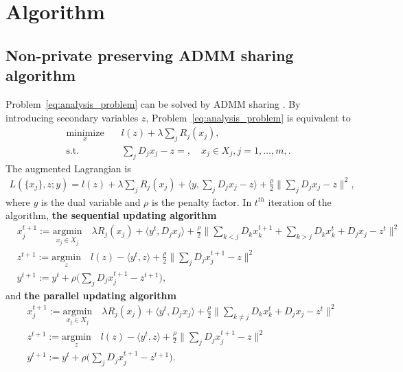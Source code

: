 \section{Algorithm}

\subsection{Non-private preserving ADMM sharing algorithm}
Problem~\eqref{eq:analysis_problem} can be solved by ADMM sharing \cite{boyd2011distributed, hong2016convergence}. By introducing secondary variables $z$, Problem~\eqref{eq:analysis_problem} is equivalent to
\begin{align}
\underset{x}{\text{minimize}} &\quad l\left(z\right) + \lambda\sum_j R_j(x_j),\\
\text{s.t.} &\quad \sum_j D_j x_j - z = ,\quad x_j\in X_j, j=1,\ldots,m,. 
\end{align}
The augmented Lagrangian is 
\begin{align}
L(\{x_j\}, z; y) = l(z) + \lambda\sum_j R_j(x_j) + \langle y, \sum_jD_j x_j - z\rangle + \frac{\rho}{2}\|\sum_j D_j x_j - z\|^2, \label{eq:lagragian}
\end{align}
where $y$ is the dual variable and $\rho$ is the penalty factor.  
In $t^{th}$ iteration of the algorithm, {\bf the sequential updating algorithm}
\begin{align}
&x_j^{t+1}:=\underset{x_j\in X_j}{\text{argmin}}\quad\lambda R_j(x_j) + \langle y^t, D_jx_j\rangle + \frac{\rho}{2}\big\|\sum_{k<j}D_kx_k^{t+1} + \sum_{k>j}D_kx_k^t + D_jx_j - z^t\big\|^2\label{eq:seq_algo_x}\\
&z^{t+1}:=\underset{z}{\text{argmin}}\quad l(z) - \langle y^t, z \rangle + \frac{\rho}{2} \big\|\sum_jD_jx_j^{t+1} - z\big\|^2\label{eq:seq_algo_z}\\
&y^{t+1}:=y^t + \rho\big(\sum_jD_jx_j^{t+1} - z^{t+1}\big),\label{eq:seq_algo_y}
\end{align}
and  {\bf the parallel updating algorithm}
\begin{align}
&x_j^{t+1}:=\underset{x_j\in X_j}{\text{argmin}}\quad\lambda R_j(x_j) + \langle y^t, D_jx_j\rangle + \frac{\rho}{2}\big\|\sum_{k\neq j}D_kx_k^{t} + D_jx_j - z^t\big\|^2\label{eq:pal_algo_x}\\
&z^{t+1}:=\underset{z}{\text{argmin}}\quad l(z)  - \langle y^t, z \rangle + \frac{\rho}{2} \big\|\sum_jD_jx_j^{t+1} - z\big\|^2\label{eq:pal_algo_z}\\
&y^{t+1}:=y^t + \rho\big(\sum_jD_jx_j^{t+1} - z^{t+1}\big).\label{eq:pal_algo_y}
\end{align}

